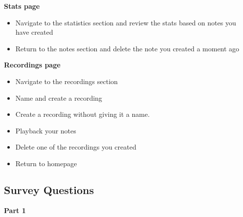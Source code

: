 \documentclass{l4proj}
\begin{document}
\begin{appendices}
\textbf{Stats page}

\begin{itemize}
    \item Navigate to the statistics section and review the stats based on notes you have created
    \item Return to the notes section and delete the note you created a moment ago
\end{itemize}

\textbf{Recordings page}

\begin{itemize}
    \item Navigate to the recordings section
    \item Name and create a recording
    \item Create a recording without giving it a name.
    \item Playback your notes
    \item Delete one of the recordings you created
    \item Return to homepage
\end{itemize}

\subsection{Survey Questions} \label{Appendix-EvalSurveyQuestions}

\textbf{Part 1}


\end{appendices}
\end{document}
